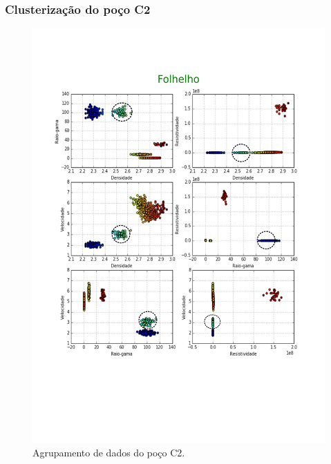 \documentclass[10pt]{beamer} %
\begin{document}
\begin{frame}
	\frametitle{Clusterização do poço C2}
	\begin{figure}[H]
		\centering
		\includegraphics[scale=0.3]{Imagens/folhelhoC1.png}
		\caption{Agrupamento de dados do poço C2.}
	\end{figure} 
\end{frame}
\end{document}
